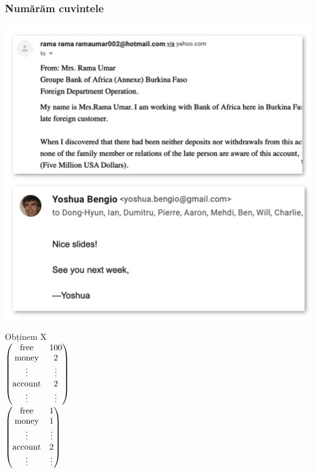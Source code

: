 \documentclass{beamer}
\begin{document}
\begin{frame}
    \frametitle{Numărăm cuvintele}
    \begin{minipage}[t!]{0.6\textwidth}
        \includegraphics[width=\textwidth]{img/7}
    \end{minipage}
    \begin{minipage}[t!]{0.39\textwidth}
        \begin{center}
            \Large Obținem X \\
            \scriptsize
            $\begin{pmatrix}
                    \textrm{free}    & 100             \\
                    \textrm{money}   & 2               \\
                    \textrm{\vdots}  & \textrm{\vdots} \\
                    \textrm{account} & 2               \\
                    \textrm{\vdots}  & \textrm{\vdots}
                \end{pmatrix}$ \\
            $\begin{pmatrix}
                    \textrm{free}    & 1               \\
                    \textrm{money}   & 1               \\
                    \textrm{\vdots}  & \textrm{\vdots} \\
                    \textrm{account} & 2               \\
                    \textrm{\vdots}  & \textrm{\vdots}
                \end{pmatrix}$
        \end{center}
    \end{minipage}
\end{frame}
\end{document}
